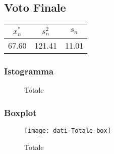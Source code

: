 \thispagestyle{empty} %
\subsection{Voto Finale}

\begin{center}
\begin{tabular}{|c|c|c|}
  \hline
  \(x_{n}^{*}\) & \(s_n^2\) & \(s_n\) \\
  \hline
 67.60 & 121.41 & 11.01 \\ 
  \hline
\end{tabular}
\end{center}

\subsubsection{Istogramma}
\begin{figure}[!h]
  \caption{Totale}
\end{figure}

\subsubsection{Boxplot}
\begin{figure}[!h]
  \centering
  \texttt{[image: dati-Totale-box]}
  \caption{Totale}
\end{figure}
\restoregeometry
\clearpage

